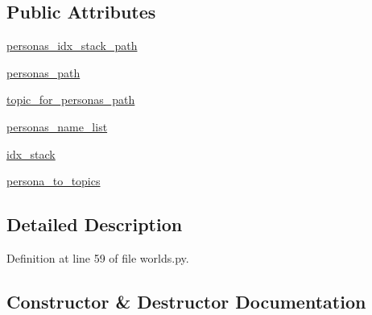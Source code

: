 \subsection*{Public Attributes}
\begin{DoxyCompactItemize}
\item 
\hyperlink{classparlai_1_1mturk_1_1tasks_1_1wizard__of__wikipedia_1_1worlds_1_1PersonasGenerator_a9c454a806475fb0b2eab6b6dac1b5296}{personas\+\_\+idx\+\_\+stack\+\_\+path}
\item 
\hyperlink{classparlai_1_1mturk_1_1tasks_1_1wizard__of__wikipedia_1_1worlds_1_1PersonasGenerator_a296d2c16e5eef15a27f6266316c2d775}{personas\+\_\+path}
\item 
\hyperlink{classparlai_1_1mturk_1_1tasks_1_1wizard__of__wikipedia_1_1worlds_1_1PersonasGenerator_a3e8ad4cab4e3e27bb7101981b7c62a65}{topic\+\_\+for\+\_\+personas\+\_\+path}
\item 
\hyperlink{classparlai_1_1mturk_1_1tasks_1_1wizard__of__wikipedia_1_1worlds_1_1PersonasGenerator_abf9a01dee416db70552558393aacc0cf}{personas\+\_\+name\+\_\+list}
\item 
\hyperlink{classparlai_1_1mturk_1_1tasks_1_1wizard__of__wikipedia_1_1worlds_1_1PersonasGenerator_a26ec8162aa90f3fa9a4e6e3d48bedc6e}{idx\+\_\+stack}
\item 
\hyperlink{classparlai_1_1mturk_1_1tasks_1_1wizard__of__wikipedia_1_1worlds_1_1PersonasGenerator_ad64661ce8580441c6facdf27a466605e}{persona\+\_\+to\+\_\+topics}
\end{DoxyCompactItemize}


\subsection{Detailed Description}


Definition at line 59 of file worlds.\+py.



\subsection{Constructor \& Destructor Documentation}
\mbox{\label{classparlai_1_1mturk_1_1tasks_1_1wizard__of__wikipedia_1_1worlds_1_1PersonasGenerator_a69ae53c0b17ddd4a5a2f4008382c4963}} 
